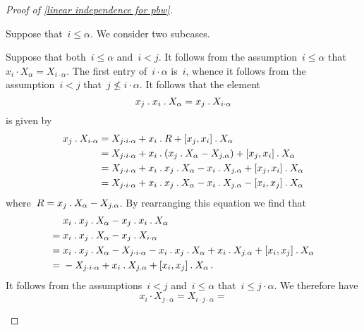 \begin{proof}[Proof of \cref{linear independence for pbw}]
	\begin{casedistinction}
		\item
			\label{first element is smaller than monomial}
			Suppose that~$i \leq \alpha$.
			We consider two subcases.
			\begin{casedistinction}
				\item
					Suppose that both~$i \leq \alpha$ and~$i < j$.
					It follows from the assumption~$i \leq \alpha$ that~$x_i \cdot X_\alpha = X_{i \cdot \alpha}$.
					The first entry of~$i \cdot \alpha$ is~$i$, whence it follows from the assumption~$i < j$ that~$j \nleq i \cdot \alpha$.
					It follows that the element
					\[
						x_j \mathbin{.} x_i \mathbin{.} X_\alpha
						=
						x_j \mathbin{.} X_{i \cdot \alpha}
					\]
					is given by
					\begin{align*}
						x_j \mathbin{.} X_{i \cdot \alpha}
						&=
						X_{j \cdot i \cdot \alpha}
						+ x_i \mathbin{.} R
						+ [x_j, x_i] \mathbin{.} X_\alpha
						\\
						&=
						X_{j \cdot i \cdot \alpha}
						+ x_i \mathbin{.} ( x_j \mathbin{.} X_\alpha - X_{j \mathbin{.} \alpha} )
						+ [x_j, x_i] \mathbin{.} X_\alpha
						\\
						&=
						X_{j \cdot i \cdot \alpha}
						+ x_i \mathbin{.} x_j \mathbin{.} X_\alpha
						- x_i \mathbin{.} X_{j \mathbin{.} \alpha}
						+ [x_j, x_i] \mathbin{.} X_\alpha
						\\
						&=
						X_{j \cdot i \cdot \alpha}
						+ x_i \mathbin{.} x_j \mathbin{.} X_\alpha
						- x_i \mathbin{.} X_{j \mathbin{.} \alpha}
						- [x_i, x_j] \mathbin{.} X_\alpha
					\end{align*}
					where~$R = x_j \mathbin{.} X_\alpha - X_{j \mathbin{.} \alpha}$.
					By rearranging this equation we find that
					\begin{align*}
						{}&
						x_i \mathbin{.} x_j \mathbin{.} X_\alpha - x_j \mathbin{.} x_i \mathbin{.} X_\alpha
						\\
						={}&
						x_i \mathbin{.} x_j \mathbin{.} X_\alpha - x_j \mathbin{.} X_{i \cdot \alpha}
						\\
						={}&
						x_i \mathbin{.} x_j \mathbin{.} X_\alpha
						- X_{j \cdot i \cdot \alpha}
						- x_i \mathbin{.} x_j \mathbin{.} X_\alpha
						+ x_i \mathbin{.} X_{j \mathbin{.} \alpha}
						+ [x_i, x_j] \mathbin{.} X_\alpha
						\\
						={}&
						- X_{j \cdot i \cdot \alpha}
						+ x_i \mathbin{.} X_{j \mathbin{.} \alpha}
						+ [x_i, x_j] \mathbin{.} X_\alpha \,.
					\end{align*}
					It follows from the assumptions~$i < j$ and~$i \leq \alpha$ that~$i \leq j \cdot \alpha$.
					We therefore have
					\[
						x_i \cdot X_{j \cdot \alpha}
						=
						X_{i \cdot j \cdot \alpha}
						=
\]
\end{casedistinction}
\end{casedistinction}
\end{proof}
